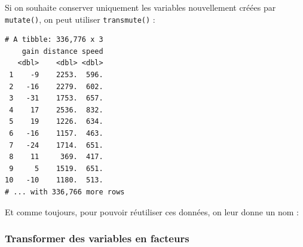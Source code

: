 \documentclass[
  a4paper,
]{article}
\newenvironment{Shaded}{\begin{snugshade}}{\end{snugshade}}
\newcommand{\DataTypeTok}[1]{\textcolor[rgb]{0.00,0.34,0.68}{#1}}
\newcommand{\DecValTok}[1]{\textcolor[rgb]{0.69,0.50,0.00}{#1}}
\newcommand{\FloatTok}[1]{\textcolor[rgb]{0.69,0.50,0.00}{#1}}
\newcommand{\KeywordTok}[1]{\textcolor[rgb]{0.12,0.11,0.11}{\textbf{#1}}}
\newcommand{\NormalTok}[1]{\textcolor[rgb]{0.12,0.11,0.11}{#1}}
\newcommand{\OperatorTok}[1]{\textcolor[rgb]{0.12,0.11,0.11}{#1}}
\newcommand{\StringTok}[1]{\textcolor[rgb]{0.75,0.01,0.01}{#1}}
\begin{document}
Si on souhaite conserver uniquement les variables nouvellement créées par \texttt{mutate()}, on peut utiliser \texttt{transmute()} :

\begin{Shaded}
\end{Shaded}

\begin{verbatim}
# A tibble: 336,776 x 3
    gain distance speed
   <dbl>    <dbl> <dbl>
 1    -9    2253.  596.
 2   -16    2279.  602.
 3   -31    1753.  657.
 4    17    2536.  832.
 5    19    1226.  634.
 6   -16    1157.  463.
 7   -24    1714.  651.
 8    11     369.  417.
 9     5    1519.  651.
10   -10    1180.  513.
# ... with 336,766 more rows
\end{verbatim}

Et comme toujours, pour pouvoir réutiliser ces données, on leur donne un nom :

\begin{Shaded}
\end{Shaded}

\hypertarget{transformer-des-variables-en-facteurs}{%
\subsubsection{Transformer des variables en facteurs}\label{transformer-des-variables-en-facteurs}}
\end{document}
